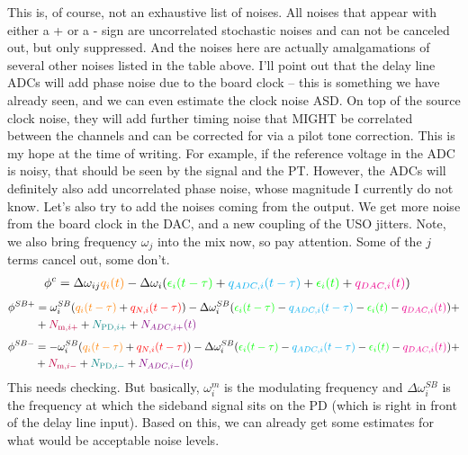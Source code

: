 \documentclass[11pt]{article}
\begin{document}
This is, of course, not an exhaustive list of noises. All noises that appear with either a + or a - sign are uncorrelated stochastic noises and can not be canceled out, but only suppressed. And the noises here are actually amalgamations of several other noises listed in the table above. I'll point out that the delay line ADCs will add phase noise due to the board clock -- this is something we have already seen, and we can even estimate the clock noise ASD. On top of the source clock noise, they will add further timing noise that MIGHT be correlated between the channels and can be corrected for via a pilot tone correction. This is my hope at the time of writing. For example, if the reference voltage in the ADC is noisy, that should be seen by the signal and the PT. However, the ADCs will definitely also add uncorrelated phase noise, whose magnitude I currently do not know. Let's also try to add the noises coming from the output. We get more noise from the board clock in the DAC, and a new coupling of the USO jitters. Note, we also bring frequency $\omega_j$ into the mix now, so pay attention. Some of the $j$ terms cancel out, some don't.
\begin{align*}
    \phi^{c}&=\Delta \omega_{ij}{\color{orange}q_{i}(t)} - \Delta \omega_i({\color{green}\epsilon_{i}(t-\tau)}+ {\color{cyan}q_{ADC,i}(t-\tau)}+{\color{green}\epsilon_{i}(t)}+ {\color{magenta}q_{DAC,i}(t)})
\end{align*}
\begin{align*}
    \phi^{SB+}&= \omega_i^{SB}({\color{orange}q_{i}(t-\tau)} + {\color{red}q_{N,i}(t-\tau)})- \Delta \omega_i^{SB}({\color{green}\epsilon_{i}(t-\tau)} - {\color{cyan}q_{ADC,i}(t-\tau)}-{\color{green}\epsilon_{i}(t)}- {\color{magenta}q_{DAC,i}(t)})+\\
    &+{\color{purple}N_{\text{m},i+}} +  {\color{teal}N_{\text{PD},i+}}+ {\color{violet}N_{ADC,i+}(t)}
\end{align*}
\begin{align*}
    \phi^{SB-}&= - \omega_i^{SB}({\color{orange}q_{i}(t-\tau)} + {\color{red}q_{N,i}(t-\tau)}) -  \Delta\omega_i^{SB}({\color{green}\epsilon_{i}(t-\tau)} - {\color{cyan}q_{ADC,i}(t-\tau)}-{\color{green}\epsilon_{i}(t)}- {\color{magenta}q_{DAC,i}(t)})+\\
    &+{\color{purple}N_{\text{m},i-}} +  {\color{teal}N_{\text{PD},i-}}+ {\color{violet}N_{ADC,i-}(t)}
\end{align*}
This needs checking. But basically, $\omega_i^{m}$ is the modulating frequency and $\Delta\omega_i^{SB}$ is the frequency at which the sideband signal sits on the PD (which is right in front of the delay line input). Based on this, we can already get some estimates for what would be acceptable noise levels.
\end{document}
